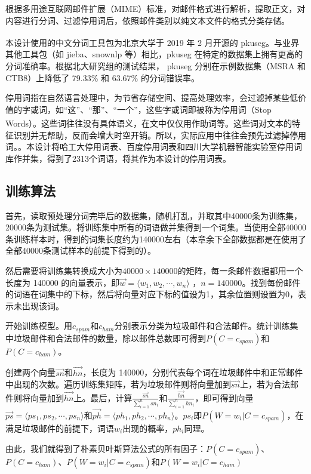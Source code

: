 \documentclass[UTF8,zihao=-4]{ctexart}
\newcommand{\upcite}[1]{\textsuperscript{\cite{#1}}}
\begin{document}
	根据多用途互联网邮件扩展（MIME）标准，对邮件格式进行解析，提取正文，对内容进行分词、过滤停用词后，依照邮件类别以纯文本文件的格式分类存储。
		
	本设计使用的中文分词工具包为北京大学于 2019 年 2 月开源的 pkuseg\upcite{pkuseg}。与业界其他工具包（如 jieba、snownlp 等）相比，pkuseg 在特定的数据集上拥有更高的分词准确率。根据北大研究组的测试结果， pkuseg 分别在示例数据集（MSRA 和 CTB8）上降低了 79.33\% 和 63.67\% 的分词错误率\cite{pkuseg}。
	
	停用词指在自然语言处理中，为节省存储空间、提高处理效率，会过滤掉某些低价值的字或词，如“这”、“那”、“一个”，这些字或词即被称为停用词（Stop Words）\upcite{stopwords}。这些词往往没有具体语义，在文中仅仅用作助词等。这些词对文本的特征识别并无帮助，反而会增大时空开销。所以，实际应用中往往会预先过滤掉停用词。。本设计将哈工大停用词表、百度停用词表和四川大学机器智能实验室停用词库作并集，得到了2313个词语，将其作为本设计的停用词表。
\subsection{训练算法}
	首先，读取预处理分词完毕后的数据集，随机打乱，并取其中40000条为训练集，20000条为测试集。将训练集中所有的词语做并集得到一个词集。当使用全部40000条训练样本时，得到的词集长度约为140000左右（本章余下全部数据都是在使用了全部40000条测试样本的前提下得到的）。
	
	然后需要将训练集转换成大小为$40000 \times 140000$的矩阵，每一条邮件数据都用一个长度为 140000 的向量表示，即$\vec{w}=\langle w_1,w_2, \cdots ,w_n\rangle$ ，$n=140000$。找到每份邮件的词语在词集中的下标，然后将向量对应下标的值设为1，其余位置则设置为0，表示未出现该词。
	
	
	开始训练模型。用$c_{spam}$和$c_{ham}$分别表示分类为垃圾邮件和合法邮件。统计训练集中垃圾邮件和合法邮件的数量，除以邮件总数即可得到$P(C=c_{spam})$和$P(C=c_{ham})$。
	
	创建两个向量$\vec{sn}$和$\vec{hn}$，长度为 140000，分别代表每个词在垃圾邮件中和正常邮件中出现的次数。遍历训练集矩阵，若为垃圾邮件则将向量加到$\vec{sn}$上，若为合法邮件则将向量加到$\vec{hn}$上。最后，计算$\frac{\vec{sn}}{\sum_{i=1}^{n}sn_i}$和$\frac{\vec{hn}}{\sum_{i=1}^{n}hn_i}$，即可得到向量$\vec{ps}=\langle ps_1,ps_2,\cdots,ps_n\rangle$和$\vec{ph}=\langle ph_1,ph_2,\cdots,ph_n\rangle$。$ps_i$即$P(W=w_i|C=c_{spam})$，在满足垃圾邮件的前提下，词语$w_i$出现的概率，$ph_i$同理。
	
	由此，我们就得到了朴素贝叶斯算法公式的所有因子：$P(C=c_{spam})$、$P(C=c_{ham})$、$P(W=w_i|C=c_{spam})$和$P(W=w_i|C=c_{ham})$
	
\end{document}
